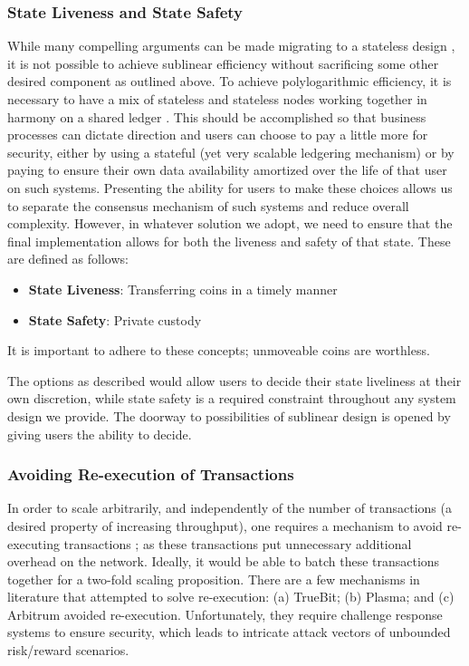 \documentclass[peerreview]{ieeesyscoin}
\begin{document}
\subsubsection{State Liveness and State Safety}

While many compelling arguments can be made migrating to a stateless design \cite{Hot19}, it is not possible to achieve sublinear efficiency without sacrificing some other desired component as outlined above. To achieve polylogarithmic efficiency, it is necessary to have a mix of stateless and stateless nodes working together in harmony on a shared ledger \cite{Hot19}. This should be accomplished so that business processes can dictate direction and users can choose to pay a little more for security, either by using a stateful (yet very scalable ledgering mechanism) or by paying to ensure their own data availability amortized over the life of that user on such systems. Presenting the ability for users to make these choices allows us to separate the consensus mechanism of such systems and reduce overall complexity. However, in whatever solution we adopt, we need to ensure that the final implementation allows for both the liveness and safety of that state. These are defined as follows:

\begin{itemize}
\item \textbf{State Liveness}: Transferring coins in a timely manner
\item \textbf{State Safety}:  Private custody
\end{itemize}

It is important to adhere to these concepts; unmoveable coins are worthless.

The options as described would allow users to decide their state liveliness at their own discretion, while state safety is a required constraint throughout any system design we provide. The doorway to possibilities of sublinear design is opened by giving users the ability to decide.


\subsubsection{Avoiding Re-execution of Transactions}

In order to scale arbitrarily, and independently of the number of transactions (a desired property of increasing throughput), one requires a mechanism to avoid re-executing transactions \cite{Bow18}; as these transactions put unnecessary additional overhead on the network. Ideally, it would be able to batch these transactions together for a two-fold scaling proposition. There are a few mechanisms in literature that attempted to solve re-execution: (a) TrueBit; (b) Plasma; and (c) Arbitrum avoided re-execution. Unfortunately, they require challenge response systems to ensure security, which leads to intricate attack vectors of unbounded risk/reward scenarios. 
\end{document}

